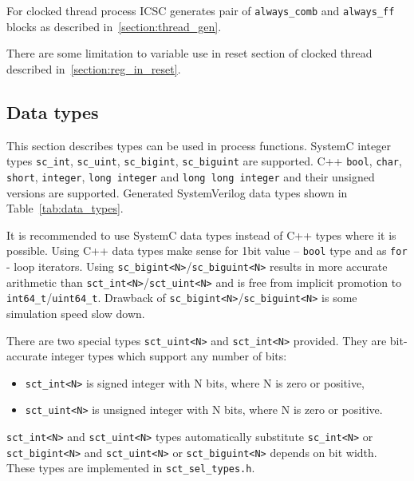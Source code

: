 For clocked thread process ICSC generates pair of {\tt always\_comb} and {\tt always\_ff} blocks as described in~\ref{section:thread_gen}.

There are some limitation to variable use in reset section of clocked thread described in~\ref{section:reg_in_reset}.

\subsection{Data types}

This section describes types can be used in process functions. 
SystemC integer types {\tt sc\_int}, {\tt sc\_uint}, {\tt sc\_bigint}, {\tt sc\_biguint} are supported. C++ {\tt bool}, {\tt char}, {\tt short}, {\tt integer}, {\tt long integer} and {\tt long long integer} and their unsigned versions are supported. Generated SystemVerilog data types shown in Table~\ref{tab:data_types}.

It is recommended to use SystemC data types instead of C++ types where it is possible. Using C++ data types make sense for 1bit value -- {\tt bool} type and as {\tt for} - loop iterators. Using {\tt sc\_bigint<N>}/{\tt sc\_biguint<N>} results in more accurate arithmetic than {\tt sct\_int<N>}/{\tt sct\_uint<N>} and is free from implicit promotion to {\tt int64\_t}/{\tt uint64\_t}. Drawback of {\tt sc\_bigint<N>}/{\tt sc\_biguint<N>} is some simulation speed slow down.

There are two special types {\tt sct\_uint<N>} and {\tt sct\_int<N>} provided. They are bit-accurate integer types which support any number of bits:
\begin{itemize}
\item {\tt sct\_int<N>} is signed integer with N bits, where N is zero or positive,
\item {\tt sct\_uint<N>} is unsigned integer with N bits, where N is zero or positive.
\end{itemize}

{\tt sct\_int<N>} and {\tt sct\_uint<N>} types automatically substitute {\tt sc\_int<N>} or {\tt sct\_bigint<N>} and {\tt sct\_uint<N>} or {\tt sct\_biguint<N>} depends on bit width. These types are implemented in {\tt sct\_sel\_types.h}.

